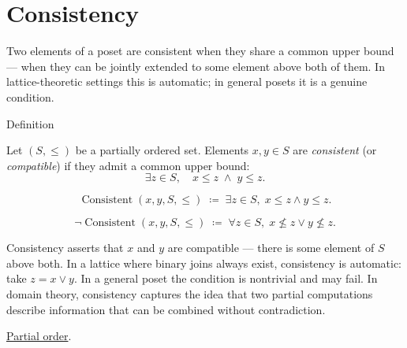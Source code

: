 
\section{Consistency}
\label{sec:consistency}

\begin{remark*}
Two elements of a poset are consistent when they share a common upper
bound --- when they can be jointly extended to some element above both of
them.  In lattice-theoretic settings this is automatic; in general posets
it is a genuine condition.
\end{remark*}


\begin{definitionbox}{Definition}
\begin{definition}[Consistency]
\label{def:consistency}
Let $(S, \leq)$ be a partially ordered set.  Elements $x, y \in S$ are
\emph{consistent} (or \emph{compatible}) if they admit a common upper
bound:
\[
\exists z \in S, \quad x \leq z \;\land\; y \leq z.
\]
\end{definition}
\end{definitionbox}

\begin{remark*}
\[
\operatorname{Consistent}(x, y, S, \leq)
\;\coloneqq\;
\exists z \in S,\; x \leq z \land y \leq z.
\]
\end{remark*}

\begin{remark*}
\[
\neg\operatorname{Consistent}(x, y, S, \leq)
\;\coloneqq\;
\forall z \in S,\; x \not\leq z \lor y \not\leq z.
\]
\end{remark*}

\begin{remark*}[Interpretation]
Consistency asserts that $x$ and $y$ are compatible --- there is some
element of $S$ above both.  In a lattice where binary joins always exist,
consistency is automatic: take $z = x \vee y$.  In a general poset the
condition is nontrivial and may fail.  In domain theory, consistency
captures the idea that two partial computations describe information that
can be combined without contradiction.
\end{remark*}

\begin{dependencies}
\hyperref[def:lattice-order-partial-order]{Partial order}.
\end{dependencies}
